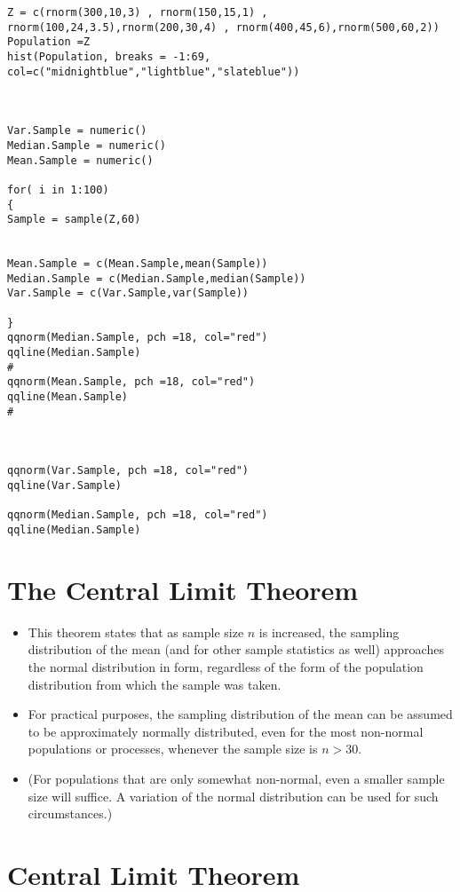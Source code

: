 \documentclass[]{report}
\begin{document}
\begin{verbatim}
Z = c(rnorm(300,10,3) , rnorm(150,15,1) , rnorm(100,24,3.5),rnorm(200,30,4) , rnorm(400,45,6),rnorm(500,60,2))
Population =Z
hist(Population, breaks = -1:69, col=c("midnightblue","lightblue","slateblue"))



Var.Sample = numeric()
Median.Sample = numeric()
Mean.Sample = numeric()

for( i in 1:100)
{
Sample = sample(Z,60)


Mean.Sample = c(Mean.Sample,mean(Sample))
Median.Sample = c(Median.Sample,median(Sample))
Var.Sample = c(Var.Sample,var(Sample))

}
qqnorm(Median.Sample, pch =18, col="red")
qqline(Median.Sample)
#
qqnorm(Mean.Sample, pch =18, col="red")
qqline(Mean.Sample)
#



qqnorm(Var.Sample, pch =18, col="red")
qqline(Var.Sample)

qqnorm(Median.Sample, pch =18, col="red")
qqline(Median.Sample)
\end{verbatim}

\section{The Central Limit Theorem }
\begin{itemize}
\item This theorem states that as sample size $n$ is increased, the sampling distribution of the mean (and for other sample statistics as well) approaches the normal distribution in form, regardless of the form of the population distribution from
which the sample was taken.
\item For practical purposes, the sampling distribution of the mean can be assumed to be
approximately normally distributed, even for the most non-normal populations or processes, whenever the
sample size is $n > 30$.
\item (For populations that are only somewhat non-normal, even a smaller sample size will
suffice. A variation of the normal distribution can be used for such circumstances.)
\end{itemize}




\section{Central Limit Theorem}
\end{document}
